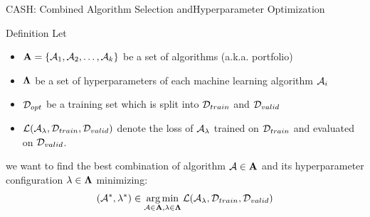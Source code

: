 \begin{frame}[c]{CASH: Combined Algorithm Selection and\newline Hyperparameter Optimization}

\begin{block}{Definition}
	Let
	\begin{itemize}
		\item \alert{$\mathbf{A} = \{\mathcal{A}_1, \mathcal{A}_2, \ldots, \mathcal{A}_k\}$ be a set of algorithms (a.k.a. portfolio)}
		\item $\mathbf{\Lambda}$ be a set of hyperparameters of each machine learning algorithm $\mathcal{A}_i$
		\item $\mathcal{D}_{opt}$ be a training set which is split into $\mathcal{D}_{train}$ and $\mathcal{D}_{valid}$ 
		\item $\mathcal{L}(\mathcal{A}_{\mathbf{\lambda}}, \mathcal{D}_{train}, \mathcal{D}_{valid})$ denote the loss of $\mathcal{A}_{\mathbf{\lambda}}$ trained on $\mathcal{D}_{train}$ and evaluated on $\mathcal{D}_{valid}$.
	\end{itemize}
	we want to find \alert{the best combination of algorithm $\mathcal{A} \in \mathbf{A}$ and its hyperparameter configuration $\mathbf{\lambda} \in \mathbf{\Lambda}$} minimizing:
	\begin{equation}
	(\mathcal{A}^*, \mathbf{\lambda}^*) \in \operatorname*{arg\,min}_{\mathcal{A} \in \mathbf{A}, \mathbf{\lambda} \in \mathbf{\Lambda}} \mathcal{L}(\mathcal{A}_{\mathbf{\lambda}}, \mathcal{D}_{train}, \mathcal{D}_{valid}) \nonumber
	\end{equation}
\end{block}

\end{frame}
